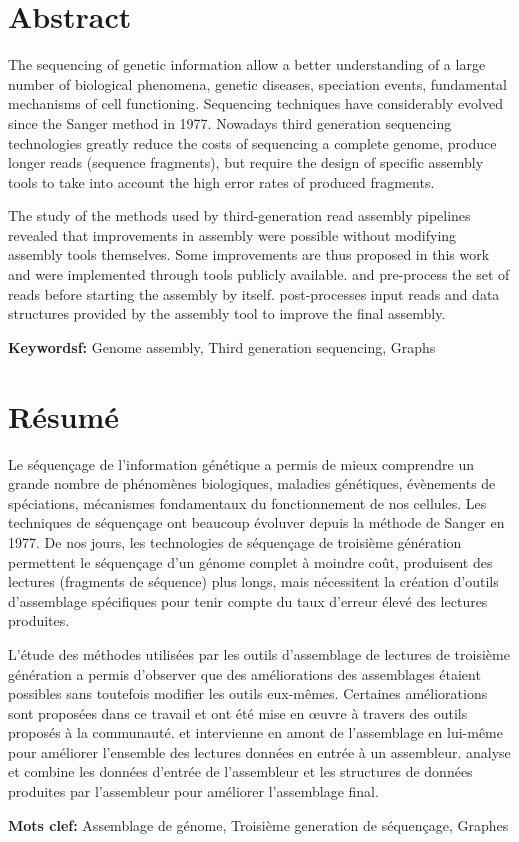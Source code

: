 \documentclass[main.tex]{subfiles}
\begin{document}
\pagestyle{empty}

\section*{Abstract}

The sequencing of genetic information allow a better understanding of a large number of biological phenomena, genetic diseases, speciation events, fundamental mechanisms of cell functioning. Sequencing techniques have considerably evolved since the Sanger method in 1977. Nowadays third generation sequencing technologies greatly reduce the costs of sequencing a complete genome, produce longer reads (sequence fragments), but require the design of specific assembly tools to take into account the high error rates of produced fragments.

The study of the methods used by third-generation read assembly pipelines revealed that improvements in assembly were possible without modifying assembly tools themselves. Some improvements are thus proposed in this work and were implemented through tools publicly available. \yacrd and \fpa pre-process the set of reads before starting the assembly by itself. \knot post-processes input reads and data structures provided by the assembly tool to improve the final assembly.

\textbf{Keywordsf:} Genome assembly, Third generation sequencing, Graphs

\section*{Résumé}

Le séquençage de l'information génétique a permis de mieux comprendre un grande nombre de phénomènes biologiques, maladies génétiques, évènements de spéciations, mécanismes fondamentaux du fonctionnement de nos cellules. Les techniques de séquençage ont beaucoup évoluver depuis la méthode de Sanger en 1977. De nos jours, les technologies de séquençage de troisième génération permettent le séquençage d'un génome complet à moindre coût, produisent des lectures (fragments de séquence) plus longs, mais nécessitent la création d'outils d'assemblage spécifiques pour tenir compte du taux d'erreur élevé des lectures produites.

L'étude des méthodes utilisées par les outils d'assemblage de lectures de troisième génération a permis d'observer que des améliorations des assemblages étaient possibles sans toutefois modifier les outils eux-mêmes. Certaines améliorations sont proposées dans ce travail et ont été mise en œuvre à travers des outils proposés à la communauté. \yacrd et \fpa  intervienne en amont de l'assemblage en lui-même pour améliorer l'ensemble des lectures données en entrée à un assembleur. \knot analyse et combine les données d'entrée de l'assembleur et les structures de données produites par l'assembleur pour améliorer l'assemblage final.

\textbf{Mots clef:} Assemblage de génome, Troisième generation de séquençage, Graphes
\end{document}
